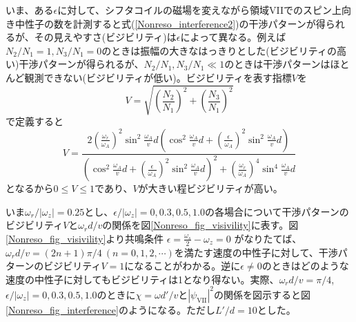 いま、ある$\epsilon$に対して、シフタコイルの磁場を変えながら領域VIIでのスピン上向き中性子の数を計測すると式(\ref{Nonreso_interference2})の干渉パターンが得られるが、その見えやすさ(ビジビリティ)は$\epsilon$によって異なる。例えば$N_2/N_1=1,N_3/N_1=0$のときは振幅の大きなはっきりとした(ビジビリティの高い)干渉パターンが得られるが、$N_2/N_1,N_3/N_1 \ll 1$のときは干渉パターンはほとんど観測できない(ビジビリティが低い)。ビジビリティを表す指標$V$を
\begin{equation}
V=\sqrt{\left(\frac{N_2}{N_1}\right)^2+\left(\frac{N_3}{N_1}\right)^2}
\end{equation}
で定義すると
\begin{equation}
V=\frac{2\left(\frac{\omega_r}{\omega_A}\right)^2\sin^2\frac{\omega_A}{v}d \left(\cos^2 \frac{\omega_A}{v}d+\left(\frac{\epsilon}{\omega_A}\right)^2\sin^2\frac{\omega_A}{v}d\right)}{\left(\cos^2 \frac{\omega_A}{v}d+\left(\frac{\epsilon}{\omega_A}\right)^2\sin^2\frac{\omega_A}{v}d\right)^2+\left(\frac{\omega_r}{\omega_A}\right)^4\sin^4\frac{\omega_A}{v}d}
\end{equation}
となるから$0 \le V \le 1$であり、$V$が大きい程ビジビリティが高い。

いま$\omega_r/|\omega_z|=0.25$とし、$\epsilon/|\omega_z|=0,0.3,0.5,1.0$の各場合について干渉パターンのビジビリティ$V$と$\omega_r d/v$の関係を図\ref{Nonreso_fig_visivility}に表す。図\ref{Nonreso_fig_visivility}より共鳴条件
$
\epsilon=\frac{\omega_s}{2}-\omega_z=0
$
がなりたてば、$\omega_r d/v =(2n+1)\pi/4 \ (n =0,1,2,\cdots)$を満たす速度の中性子に対して、干渉パターンのビジビリティ$V=1$になることがわかる。逆に$\epsilon \neq 0$のときはどのような速度の中性子に対してもビジビリティは1となり得ない。実際、$\omega_rd/v=\pi/4$,$\epsilon/|\omega_z|=0,0.3,0.5,1.0$のときに$\chi=\omega d'/v$と$|\psi_\mathrm{VII}|^2$の関係を図示すると図\ref{Nonreso_fig_interference}のようになる。ただし$L'/d=10$とした。

